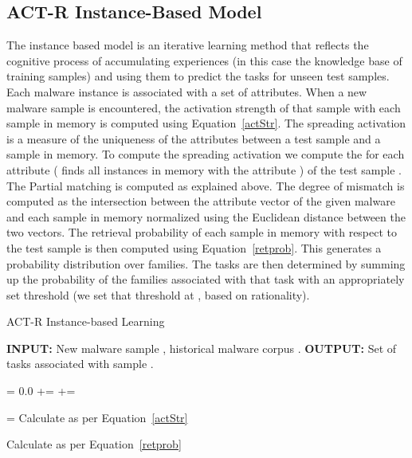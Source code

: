 \documentclass[conference]{IEEEtran}
\begin{document}
\subsection{ACT-R Instance-Based Model}
The instance based model is an iterative learning method that reflects the cognitive process of accumulating experiences (in this case the knowledge base of training samples) and using them to predict the tasks for unseen test samples. Each malware instance is associated with a set of attributes. When a new malware sample is encountered, the activation strength of that sample with each sample in memory is computed using Equation~\ref{actStr}. The spreading activation is a measure of the uniqueness of the attributes between a test sample  and a sample  in memory. To compute the spreading activation we compute the  for each attribute  ( finds all instances in memory with the attribute ) of the test sample .  The Partial matching is computed as explained above.  The degree of mismatch is computed as the intersection between the attribute vector of the given malware and each sample in memory normalized using the Euclidean distance between the two vectors. The retrieval probability of each sample  in memory with respect to the test sample  is then computed using Equation~\ref{retprob}.  This generates a probability distribution over families.  The tasks are then determined by summing up the probability of the families associated with that task with an appropriately set threshold (we set that threshold at , based on rationality).

\begin{algorithm}[]
	\caption{ACT-R Instance-based Learning}
	\begin{algorithmic}
		
		
		\STATE \textbf {INPUT:} New malware sample , historical malware corpus .
		\STATE \textbf {OUTPUT:} Set of tasks associated with sample .
		
		
		
		\STATE 
		
		\STATE 
		\STATE  = 0.0
		\FOR {}		
		\IF {}
		\STATE  +=  
		\ELSE
		\STATE  += 
		\ENDIF
		\ENDFOR
		
		
		\STATE  = 
		\STATE Calculate  as per Equation~\ref{actStr}
	
		\ENDFOR
		
		\STATE Calculate  as per Equation~\ref{retprob}
		\STATE 
		
		
		\STATE 
		\ENDFOR
		
	\end{algorithmic}
	
\end{algorithm}
\end{document}
